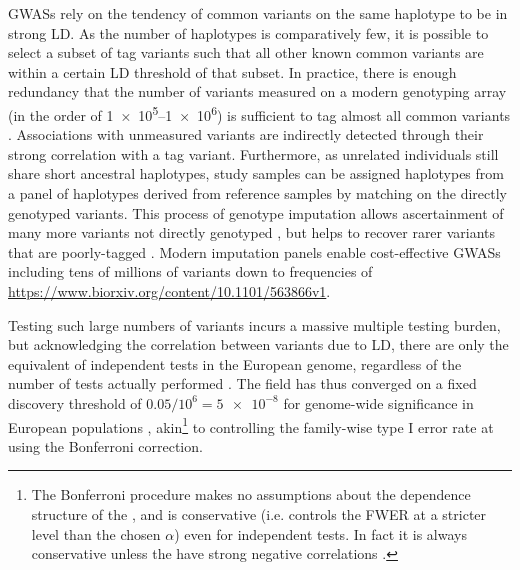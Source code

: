\begin{outline}
\glspl{GWAS} rely on the tendency of common variants on the same haplotype to be in strong \gls{LD}.
As the number of haplotypes is comparatively few, 
it is possible to select a subset of tag variants such that all other known common variants are within a certain \gls{LD} threshold of that subset. 
In practice, there is enough redundancy that the number of variants measured on a modern genotyping array (in the order of \numrange[retain-unity-mantissa=false]{1e5}{1e6}) is sufficient to tag almost all common variants  \autocite{theinternationalhapmapconsortium2005HaplotypeMapHuman,barrett2006EvaluatingCoverageGenomewide}.
Associations with unmeasured variants are indirectly detected through their strong correlation with a tag variant.
Furthermore, as unrelated individuals still share short ancestral haplotypes, 
study samples can be assigned haplotypes from a panel of haplotypes derived from reference samples by matching on the directly genotyped variants.
This process of genotype imputation allows ascertainment of many more variants not directly genotyped \autocite{das2018GenotypeImputationLarge},
but helps to recover rarer variants that are poorly-tagged \autocite{visscher201710YearsGWAS}.
Modern imputation panels enable cost-effective \glspl{GWAS} including tens of millions of variants down to frequencies of  \url{https://www.biorxiv.org/content/10.1101/563866v1}.

Testing such large numbers of variants incurs a massive multiple testing burden, but acknowledging the correlation between variants due to \gls{LD},
there are only the equivalent of  independent tests in the European genome, regardless of the number of tests actually performed \autocite{peer2008EstimationMultipleTesting}.
The field has thus converged on a fixed discovery threshold of $0.05 / 10^6 = \num{5e-8}$ for genome-wide significance in European populations \autocite{jannot2015108HasEmerged}, akin\footnote{
    The Bonferroni procedure makes no assumptions about the dependence structure of the \pvalues{}, and is conservative (i.e. controls the \gls{FWER} at a stricter level than the chosen $\alpha$) even for independent tests. In fact it is always conservative unless the \pvalues{} have strong negative correlations \autocite{goeman2014MultipleHypothesisTesting}.
}
to controlling the family-wise type I error rate at using the Bonferroni correction.


\end{outline}

